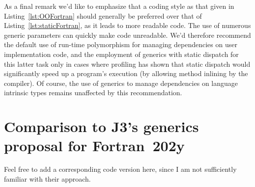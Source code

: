 \documentclass[11pt,oneside]{article}
\begin{document}
As a final remark we'd like to emphasize that a coding style as that
given in Listing~\ref{lst:OOFortran} should generally be preferred
over that of Listing~\ref{lst:staticFortran}, as it leads to more
readable code. The use of numerous generic parameters can quickly make
code unreadable. We'd therefore recommend the default use of run-time
polymorphism for managing dependencies on user implementation code,
and the employment of generics with static dispatch for this latter
task only in cases where profiling has shown that static dispatch
would significantly speed up a program's execution (by allowing method
inlining by the compiler). Of course, the use of generics to manage
dependencies on language intrinsic types remains unaffected by this
recommendation.

\section{Comparison to J3's generics proposal for Fortran~202y}

{\sf Feel free to add a corresponding code version here,
since I am not sufficiently familiar with their approach.}




\end{document}
